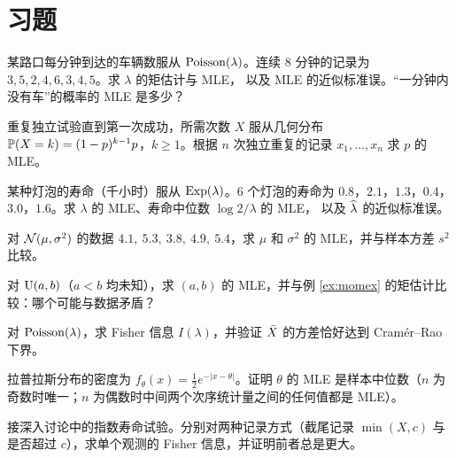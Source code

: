 \section*{习题}

\levelA
\begin{exercise}
某路口每分钟到达的车辆数服从 $\Pois(\lambda)$。连续 $8$ 分钟的记录为 $3,5,2,4,6,3,4,5$。求 $\lambda$ 的矩估计与 MLE，
以及 MLE 的近似标准误。“一分钟内没有车”的概率的 MLE 是多少？
\end{exercise}

\begin{exercise}
重复独立试验直到第一次成功，所需次数 $X$ 服从几何分布 $\P(X=k)=(1-p)^{k-1}p$，$k\ge1$。根据 $n$ 次独立重复的记录 $x_1,\dots,x_n$ 求 $p$ 的 MLE。
\end{exercise}

\begin{exercise}
某种灯泡的寿命（千小时）服从 $\Exp(\lambda)$。$6$ 个灯泡的寿命为 $0.8$，$2.1$，$1.3$，$0.4$，$3.0$，$1.6$。求 $\lambda$ 的 MLE、寿命中位数 $\log2/\lambda$ 的 MLE，
以及 $\hatt\lambda$ 的近似标准误。
\end{exercise}

\begin{exercise}
对 $\N(\mu,\sigma^2)$ 的数据 $4.1,\ 5.3,\ 3.8,\ 4.9,\ 5.4$，求 $\mu$ 和 $\sigma^2$ 的 MLE，并与样本方差 $s^2$ 比较。
\end{exercise}

\levelB
\begin{exercise}
对 $\Unif(a,b)$（$a<b$ 均未知），求 $(a,b)$ 的 MLE，并与例 \ref{ex:momex} 的矩估计比较：哪个可能与数据矛盾？
\end{exercise}

\begin{exercise}
对 $\Pois(\lambda)$，求 Fisher 信息 $I(\lambda)$，并验证 $\Xbar$ 的方差恰好达到 Cramér–Rao 下界。
\end{exercise}

\begin{exercise}
拉普拉斯分布的密度为 $f_\theta(x)=\frac12e^{-|x-\theta|}$。证明 $\theta$ 的 MLE 是样本中位数（$n$ 为奇数时唯一；$n$ 为偶数时中间两个次序统计量之间的任何值都是 MLE）。
\end{exercise}

\begin{exercise}\label{ex3:info}
接深入讨论中的指数寿命试验。分别对两种记录方式（截尾记录 $\min(X,c)$ 与是否超过 $c$），求单个观测的 Fisher 信息，并证明前者总是更大。
\end{exercise}

